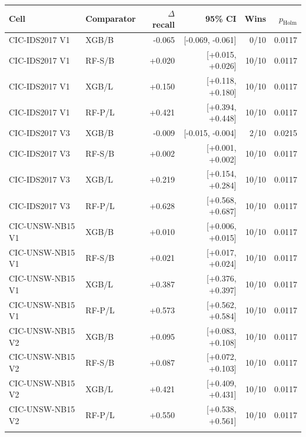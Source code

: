 \begin{tabular}{@{}llrrrr@{}}
\toprule
Cell & Comparator & $\Delta$ recall & 95\% CI & Wins & $p_{\mathrm{Holm}}$ \\
\midrule
CIC-IDS2017 V1 & XGB/B & -0.065 & [-0.069, -0.061] & 0/10 & 0.0117 \\
CIC-IDS2017 V1 & RF-S/B & +0.020 & [+0.015, +0.026] & 10/10 & 0.0117 \\
CIC-IDS2017 V1 & XGB/L & +0.150 & [+0.118, +0.180] & 10/10 & 0.0117 \\
CIC-IDS2017 V1 & RF-P/L & +0.421 & [+0.394, +0.448] & 10/10 & 0.0117 \\
\addlinespace
CIC-IDS2017 V3 & XGB/B & -0.009 & [-0.015, -0.004] & 2/10 & 0.0215 \\
CIC-IDS2017 V3 & RF-S/B & +0.002 & [+0.001, +0.002] & 10/10 & 0.0117 \\
CIC-IDS2017 V3 & XGB/L & +0.219 & [+0.154, +0.284] & 10/10 & 0.0117 \\
CIC-IDS2017 V3 & RF-P/L & +0.628 & [+0.568, +0.687] & 10/10 & 0.0117 \\
\addlinespace
CIC-UNSW-NB15 V1 & XGB/B & +0.010 & [+0.006, +0.015] & 10/10 & 0.0117 \\
CIC-UNSW-NB15 V1 & RF-S/B & +0.021 & [+0.017, +0.024] & 10/10 & 0.0117 \\
CIC-UNSW-NB15 V1 & XGB/L & +0.387 & [+0.376, +0.397] & 10/10 & 0.0117 \\
CIC-UNSW-NB15 V1 & RF-P/L & +0.573 & [+0.562, +0.584] & 10/10 & 0.0117 \\
\addlinespace
CIC-UNSW-NB15 V2 & XGB/B & +0.095 & [+0.083, +0.108] & 10/10 & 0.0117 \\
CIC-UNSW-NB15 V2 & RF-S/B & +0.087 & [+0.072, +0.103] & 10/10 & 0.0117 \\
CIC-UNSW-NB15 V2 & XGB/L & +0.421 & [+0.409, +0.431] & 10/10 & 0.0117 \\
CIC-UNSW-NB15 V2 & RF-P/L & +0.550 & [+0.538, +0.561] & 10/10 & 0.0117 \\
\addlinespace
\bottomrule
\end{tabular}